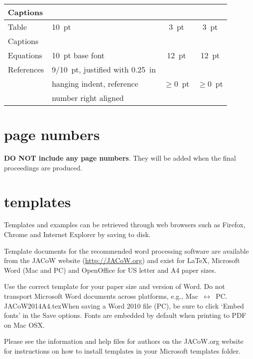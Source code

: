 \documentclass[a4paper,
              ]{jacow}
\begin{document}
\begin{table}[h!t]
\begin{tabular}{@{}llcc@{}}
         Captions      &                             &                 &      \\
        \midrule
         Table         & \SI{10}{pt}                      & \SI{3}{pt}           & \SI{3}{pt}  \\
         Captions      &                             &                 &      \\
        \midrule
         Equations     & \SI{10}{pt} base font            & \SI{12}{pt}          & \SI{12}{pt} \\
        \midrule
         References    & \SI{9/10}{pt}, justified with  \SI{0.25}{in} &      &  \\
                       & hanging indent, reference   & $\ge$\SI{0}{pt} & $\ge$\SI{0}{pt}  \\
                       & number right aligned     &                 &        \\
        \bottomrule
    \end{tabular}
\end{table}

\section{page numbers}

\textbf{DO NOT include any page numbers}. They will be added
when the final proceedings are produced.

\section{templates}

Templates and examples can be retrieved through web
browsers such as Firefox, Chrome and Internet Explorer by saving to disk.

Template documents for the recommended word processing software are
available from the JACoW website (\url{http://JACoW.org}) and exist for
\LaTeX, Microsoft Word (Mac and PC) and OpenOffice for US letter and A4 paper sizes.

Use the correct template for your paper size and version of Word.
Do not transport Microsoft Word documents across platforms, e.g.,
Mac~$\leftrightarrow$~PC. JACoW2014A4.texWhen saving a Word 2010 file (PC), be sure
to click `Embed fonts' in the Save options. Fonts are embedded by default
when printing to PDF on Mac OSX.

Please see the information and help files for authors on the JACoW.org website
for instructions  on  how to install templates in your Microsoft templates folder.
\end{document}
